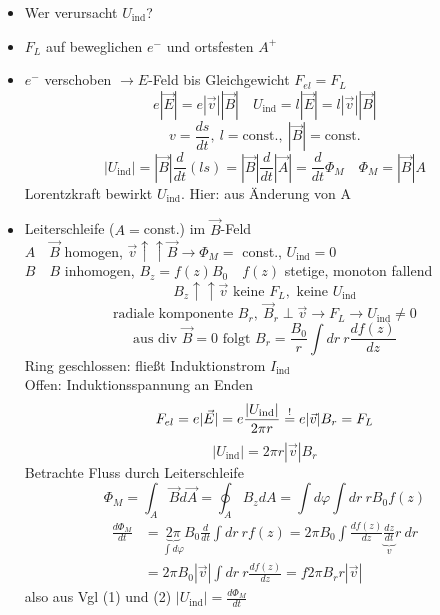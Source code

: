 \documentclass[titlepage,12pt,a4paper,ngerman]{report}
\newcommand{\tx}[1]{\textrm{#1}}
\newcommand{\uind}{U_{\tx{ind}}}
\begin{document}
\begin{itemize}
	\item Wer verursacht $\uind$?
	\item $F_L$ auf beweglichen $e^-$ und ortsfesten $A^+$
	\item $e^-$ verschoben $\rightarrow E$-Feld bis Gleichgewicht $F_{el} = F_L$
	$$e|\vec{E}| = e |\vec{v}||\vec{B}| \quad \uind = l |\vec{E}| = l|\vec{v}||\vec{B}|$$
	$$v = \frac{ds}{dt},\ l=\tx{const.},\ |\vec{B}| = \tx{const.}$$
	$$|\uind| = |\vec{B}|\frac{d}{dt}(ls) = |\vec{B}| \frac{d}{dt}|\vec{A}| = \frac{d}{dt}\Phi_M \quad \Phi_M = |\vec{B}|A$$
	Lorentzkraft bewirkt $\uind$. Hier: aus Änderung von A
	\item Leiterschleife ($A=$const.) im $\vec{B}$-Feld\\
	$\boxed{A} \quad \vec{B}$ homogen, $\vec{v} \uparrow \uparrow \vec{B} \rightarrow \Phi_M = $ const., $\uind = 0$\\
	$\boxed{B} \quad B$ inhomogen, $B_z = f(z) B_0 \quad f(z)$ stetige, monoton fallend
	$$B_z \uparrow\uparrow \vec{v} \tx{ keine } F_L, \tx{ keine } \uind$$
	$$\tx{radiale komponente }B_r,\ \vec{B}_r \perp \vec{v} \rightarrow F_L \rightarrow \uind \neq 0$$
	$$\tx{aus div }\vec{B} =0 \tx{ folgt } B_r = \frac{B_0}{r} \int dr\ r \frac{df(z)}{dz}$$
	Ring geschlossen: fließt Induktionstrom $I_{\tx{ind}}$\\
	Offen: Induktionsspannung an Enden
	$$F_{el} = e |\vec{E}| = e \frac{|\uind|}{2\pi r} \buildrel ! \over = e|\vec{v}| B_r = F_L$$
	\begin{equation*}
	|\uind| = 2\pi r |\vec{v}| B_r \tag{1}
	\end{equation*}
	Betrachte Fluss durch Leiterschleife
	$$\Phi_M = \int_A \vec{B}d\vec{A}= \oint_A B_z dA = \int d \varphi \int dr\ r B_0 f(z)$$
	\begin{align*}
	\frac{d \Phi_M}{dt} &= \underbrace{2 \pi}_{\int d \varphi} B_0 \frac{d}{dt} \int dr\ r f(z) = 2 \pi B_0 \int \frac{df(z)}{dz}\underbrace{\frac{dz}{dt}}_{v}r\ dr\\
	&= 2\pi B_0 |\vec{v}| \int dr\ r \frac{df(z)}{dz} = f2\pi B_r r |\vec{v}| \tag{2}
	\end{align*}
	also aus Vgl (1) und (2) $|\uind| = \frac{d \Phi_M}{dt}$
\end{itemize}
\end{document}
